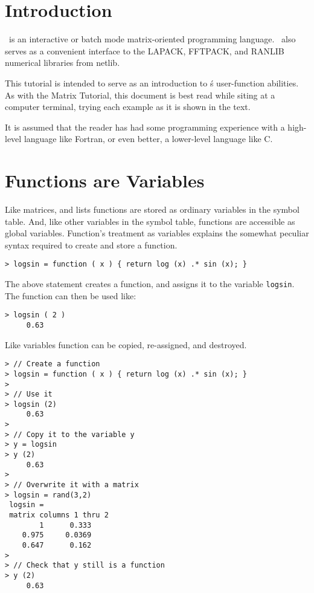 \section{Introduction}

   \RLaB\ is an interactive or batch mode matrix-oriented programming
   language. \RLaB\ also serves as a convenient interface to the
   LAPACK, FFTPACK, and RANLIB numerical libraries from netlib.

   This tutorial is intended to serve as an introduction to \RLaB\'s
   user-function abilities. As with the Matrix Tutorial, this document
   is best read while siting at a computer terminal, trying each
   example as it is shown in the text.

   It is assumed that the reader has had some programming experience
   with a high-level language like Fortran, or even better, a
   lower-level language like C. 

\section{Functions are Variables}

   Like matrices, and lists functions are stored as ordinary variables
   in the symbol table. And, like other variables in the symbol table,
   functions are accessible as global variables. Function's treatment
   as variables explains the somewhat peculiar syntax required to
   create and store a function.

\begin{verbatim}
> logsin = function ( x ) { return log (x) .* sin (x); }
\end{verbatim}

   The above statement creates a function, and assigns it to the
   variable \verb+logsin+. The function can then be used like:

\begin{verbatim}
> logsin ( 2 )
     0.63
\end{verbatim}

   Like variables function can be copied, re-assigned, and destroyed. 

\begin{verbatim}
> // Create a function
> logsin = function ( x ) { return log (x) .* sin (x); }
>
> // Use it
> logsin (2)
     0.63
>
> // Copy it to the variable y
> y = logsin
> y (2)
     0.63
>
> // Overwrite it with a matrix
> logsin = rand(3,2)
 logsin =
 matrix columns 1 thru 2
        1      0.333  
    0.975     0.0369  
    0.647      0.162  
>
> // Check that y still is a function
> y (2)
     0.63
\end{verbatim}


